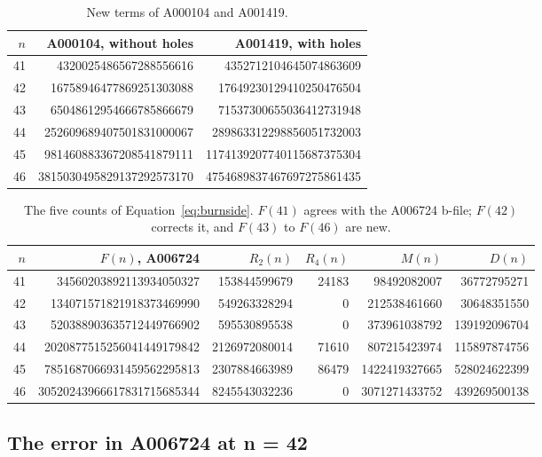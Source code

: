 \documentclass[11pt]{a000104}
\numberwithin{equation}{section}
\begin{document}
\begin{table}[!htbp]
  \centering
  \begin{tabular}{rrr}
    \toprule
    $n$ & A000104, without holes & A001419, with holes \\
    \midrule
    41 & 4320025486567288556616 & 4352712104645074863609 \\
    42 & 16758946477869251303088 & 17649230129410250476504 \\
    43 & 65048612954666785866679 & 71537300655036412731948 \\
    44 & 252609689407501831000067 & 289863312298856051732003 \\
    45 & 981460883367208541879111 & 1174139207740115687375304 \\
    46 & 3815030495829137292573170 & 4754689837467697275861435 \\
    \bottomrule
  \end{tabular}
  \caption{New terms of A000104 and A001419.}
  \label{tab:terms}
\end{table}

\begin{table}[!htbp]
  \centering
  \footnotesize
  \begin{tabular}{rrrrrr}
    \toprule
    $n$ & $F(n)$, A006724 & $R_2(n)$ & $R_4(n)$ & $M(n)$ & $D(n)$ \\
    \midrule
    41 & 34560203892113934050327 & 153844599679 & 24183 & 98492082007 & 36772795271 \\
    42 & 134071571821918373469990 & 549263328294 & 0 & 212538461660 & 30648351550 \\
    43 & 520388903635712449766902 & 595530895538 & 0 & 373961038792 & 139192096704 \\
    44 & 2020877515256041449179842 & 2126972080014 & 71610 & 807215423974 & 115897874756 \\
    45 & 7851687066931459562295813 & 2307884663989 & 86479 & 1422419327665 & 528024622399 \\
    46 & 30520243966617831715685344 & 8245543032236 & 0 & 3071271433752 & 439269500138 \\
    \bottomrule
  \end{tabular}
  \caption{The five counts of Equation~\eqref{eq:burnside}. $F(41)$ agrees with the A006724 b-file; $F(42)$ corrects it, and $F(43)$ to $F(46)$ are new.}
  \label{tab:components}
\end{table}

\subsection{The error in A006724 at n = 42}\label{sec:error}
\end{document}
